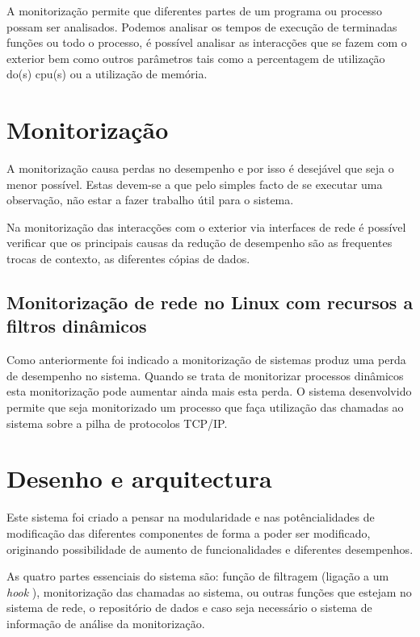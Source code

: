 \documentclass[runningheads,a4paper]{llncs}
\begin{document}
A monitorização permite que diferentes partes de um programa ou processo possam ser analisados. Podemos analisar os tempos de execução de terminadas funções ou todo o processo, é possível analisar as interacções que se fazem com o exterior bem como outros parâmetros tais como a percentagem de utilização do(s) cpu(s) ou a utilização de memória.

\section{Monitorização}
\label{sec:mon_intro}


A monitorização causa perdas no desempenho e por isso é desejável que seja o menor possível. Estas devem-se a que pelo simples facto de se executar uma observação, não estar a fazer trabalho útil para o sistema.

Na monitorização das interacções com o exterior via interfaces de rede é possível verificar que os principais causas da redução de desempenho são as frequentes trocas de contexto, as diferentes cópias de dados.


\subsection{Monitorização de rede no Linux com recursos a filtros dinâmicos}
\label{sub:mon_network__with_dynamic_filters_linux}

Como anteriormente foi indicado a monitorização de sistemas produz uma perda de desempenho no sistema. Quando se trata de monitorizar processos dinâmicos esta monitorização pode aumentar ainda mais esta perda. O sistema desenvolvido permite que seja monitorizado um processo que faça utilização das chamadas ao sistema sobre a pilha de protocolos TCP/IP.


\section{Desenho e arquitectura}
\label{sec:architecture}

Este sistema foi criado a pensar na modularidade e nas potêncialidades de modificação das diferentes componentes de forma a poder ser modificado, originando possibilidade de aumento de funcionalidades e diferentes desempenhos.

As quatro partes essenciais do sistema são: função de filtragem (ligação a um \textit{hook} ), monitorização das chamadas ao sistema, ou outras funções que estejam no sistema de rede, o repositório de dados e caso seja necessário o sistema de informação de análise da monitorização.
\end{document}
